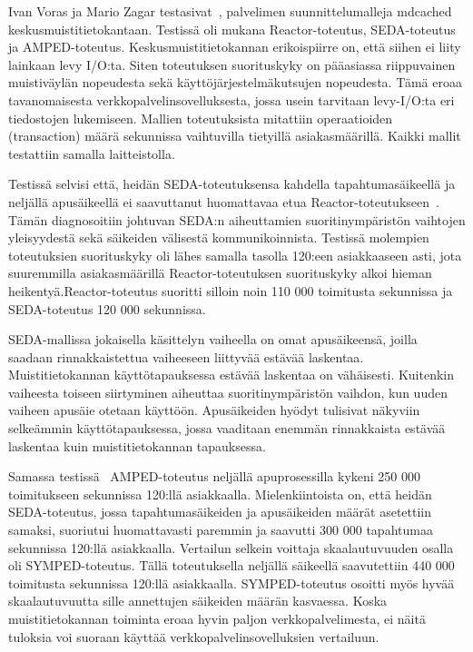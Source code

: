 \documentclass[finnish]{tktltiki2}%
\theoremstyle{definition}
\theoremstyle{remark}
\begin{document}
Ivan Voras ja Mario Zagar testasivat~\cite{voras_characteristics_2009},
palvelimen suunnittelumalleja mdcached keskusmuistitietokantaan.
Testissä oli mukana Reactor-toteutus, SEDA-toteutus ja AMPED-toteutus.
Keskusmuistitietokannan erikoispiirre on, että siihen ei liity lainkaan levy I/O:ta.
Siten toteutuksen suorituskyky on pääasiassa riippuvainen muistiväylän nopeudesta sekä
käyttöjärjestelmäkutsujen nopeudesta. Tämä eroaa tavanomaisesta
verkkopalvelinsovelluksesta, jossa usein tarvitaan levy-I/O:ta 
eri tiedostojen lukemiseen.
Mallien toteutuksista mitattiin operaatioiden (transaction) määrä sekunnissa vaihtuvilla tietyillä
asiakasmäärillä. Kaikki mallit testattiin samalla laitteistolla.


Testissä selvisi että, heidän SEDA-toteutuksensa kahdella tapahtumasäikeellä ja neljällä apusäikeellä
ei saavuttanut huomattavaa
etua Reactor-toteutukseen~\cite{voras_characteristics_2009}. Tämän diagnosoitiin
johtuvan SEDA:n aiheuttamien suoritinympäristön vaihtojen yleisyydestä
sekä säikeiden välisestä kommunikoinnista.
Testissä molempien toteutuksien suorituskyky
oli lähes samalla tasolla 120:een asiakkaaseen asti, jota
suuremmilla asiakasmäärillä Reactor-toteutuksen suorituskyky alkoi
hieman heikentyä.Reactor-toteutus suoritti silloin noin 110 000 toimitusta sekunnissa
ja SEDA-toteutus 120 000 sekunnissa.

SEDA-mallissa jokaisella käsittelyn vaiheella on omat apusäikeensä,
joilla saadaan rinnakkaistettua vaiheeseen liittyvää estävää laskentaa.
Muistitietokannan käyttötapauksessa estävää laskentaa on vähäisesti.
Kuitenkin vaiheesta toiseen siirtyminen aiheuttaa suoritinympäristön vaihdon,
kun uuden vaiheen apusäie otetaan käyttöön.
Apusäikeiden hyödyt
tulisivat näkyviin selkeämmin käyttötapauksessa, jossa vaaditaan enemmän
rinnakkaista estävää laskentaa kuin muistitietokannan tapauksessa.

Samassa testissä~\cite{voras_characteristics_2009} AMPED-toteutus neljällä apuprosessilla
kykeni 250 000 toimitukseen sekunnissa 120:llä asiakkaalla. Mielenkiintoista on,
että heidän SEDA-toteutus, jossa tapahtumasäikeiden ja apusäikeiden
määrät asetettiin samaksi, suoriutui huomattavasti paremmin ja
saavutti 300 000 tapahtumaa sekunnissa 120:llä asiakkaalla.
Vertailun selkein voittaja skaalautuvuuden
osalla oli SYMPED-toteutus.
Tällä toteutuksella neljällä säikeellä
saavutettiin 440 000 toimitusta sekunnissa 120:llä asiakkaalla.
SYMPED-toteutus osoitti myös hyvää skaalautuvuutta
sille annettujen säikeiden määrän kasvaessa.
Koska muistitietokannan toiminta eroaa
hyvin paljon verkkopalvelimesta, ei näitä
tuloksia voi suoraan käyttää verkkopalvelinsovelluksien 
vertailuun.
\end{document}
